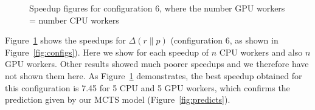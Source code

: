 \documentclass[smallextended]{svjour3}
\begin{document}
\begin{figure}
\begin{center}
\caption{Speedup figures for configuration 6, where the number GPU workers = number CPU workers}
\label{ver3}
\end{center}
\end{figure}

Figure~\ref{ver3} shows the speedups for $ \Delta(r \parallel p)$ (configuration 6, as shown in Figure~\ref{fig:configs}). Here
we show for each speedup of $n$ CPU workers and also $n$ GPU workers. Other results showed much poorer speedups and
we therefore have not shown them here. %
As Figure~\ref{ver3} demonstrates, the best speedup obtained for this configuration is 7.45 for 5 CPU and 5 GPU workers, which confirms the
prediction given by our MCTS model (Figure~\ref{fig:predicts}).
\end{document}
